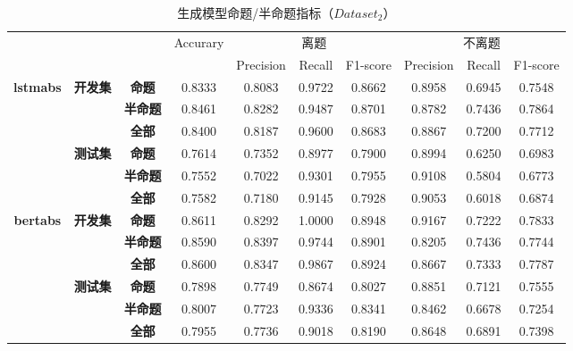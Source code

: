 \documentclass[11pt]{article}
\begin{document}
\begin{CJK}{UTF8}{gkai}
\begin{table}[htbp]\small
  \centering
    \begin{tabular}{cccccccccc}
      \hline
      \multicolumn{3}{c}{\multirow{2}[0]{*}{\textcolor[rgb]{ 1,  0,  0}{}}} & \multicolumn{1}{c}{\multirow{2}[0]{*}{Accurary}} & \multicolumn{3}{p{12.57em}}{离题} & \multicolumn{3}{p{12.57em}}{不离题} \\
      \multicolumn{3}{c}{}  &       & \multicolumn{1}{p{4.19em}}{Precision} & \multicolumn{1}{p{4.19em}}{Recall} & \multicolumn{1}{p{4.19em}}{F1-score} & \multicolumn{1}{p{4.19em}}{Precision} & \multicolumn{1}{p{4.19em}}{Recall} & \multicolumn{1}{p{4.19em}}{F1-score} \\
      \hline
      \multicolumn{1}{c}{\multirow{6}[0]{*}{\textbf{lstmabs}}} & \multicolumn{1}{c}{\multirow{3}[0]{*}{\textbf{开发集}}} & \textbf{命题} & 0.8333  & 0.8083  & 0.9722  & 0.8662  & 0.8958  & 0.6945  & 0.7548  \\
      &       & \textbf{半命题} & 0.8461  & 0.8282  & 0.9487  & 0.8701  & 0.8782  & 0.7436  & 0.7864  \\
      &       & \textbf{全部} & 0.8400  & 0.8187  & 0.9600  & 0.8683  & 0.8867  & 0.7200  & 0.7712  \\
      \cline{2-10}
      & \multicolumn{1}{c}{\multirow{3}[0]{*}{\textbf{测试集}}} & \textbf{命题} & 0.7614  & 0.7352  & 0.8977  & 0.7900  & 0.8994  & 0.6250  & 0.6983  \\
      &       & \textbf{半命题} & 0.7552  & 0.7022  & 0.9301  & 0.7955  & 0.9108  & 0.5804  & 0.6773  \\
      &       & \textbf{全部} & 0.7582  & 0.7180  & 0.9145  & 0.7928  & 0.9053  & 0.6018  & 0.6874  \\
      \hline
      \multicolumn{1}{c}{\multirow{6}[0]{*}{\textbf{bertabs}}} & \multicolumn{1}{c}{\multirow{3}[0]{*}{\textbf{开发集}}} & \textbf{命题} & 0.8611  & 0.8292  & 1.0000  & 0.8948  & 0.9167  & 0.7222  & 0.7833  \\
      &       & \textbf{半命题} & 0.8590  & 0.8397  & 0.9744  & 0.8901  & 0.8205  & 0.7436  & 0.7744  \\
      &       & \textbf{全部} & 0.8600  & 0.8347  & 0.9867  & 0.8924  & 0.8667  & 0.7333  & 0.7787  \\
      \cline{2-10}
      & \multicolumn{1}{c}{\multirow{3}[0]{*}{\textbf{测试集}}} & \textbf{命题} & 0.7898  & 0.7749  & 0.8674  & 0.8027  & 0.8851  & 0.7121  & 0.7555  \\
      &       & \textbf{半命题} & 0.8007  & 0.7723  & 0.9336  & 0.8341  & 0.8462  & 0.6678  & 0.7254  \\
      &       & \textbf{全部} & 0.7955  & 0.7736  & 0.9018  & 0.8190  & 0.8648  & 0.6891  & 0.7398  \\
      \hline
    \end{tabular}%
    \caption{生成模型命题/半命题指标（$Dataset_2$）}
  \label{tab:addlabel}%
\end{table}%



\end{CJK}
\end{document}
